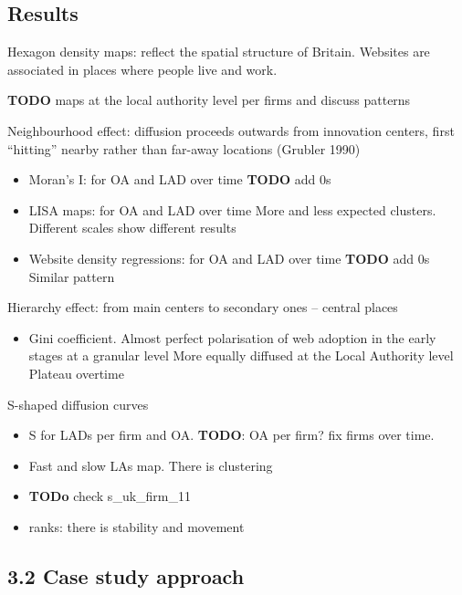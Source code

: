 \documentclass[preprint, 3p,
authoryear]{elsarticle} %
\providecommand{\tightlist}{%
  \setlength{\itemsep}{0pt}\setlength{\parskip}{0pt}}
\begin{document}
\hypertarget{sec3.1}{%
\subsection{Results}\label{sec3.1}}

Hexagon density maps: reflect the spatial structure of Britain. Websites
are associated in places where people live and work.

\textbf{TODO} maps at the local authority level per firms and discuss
patterns

Neighbourhood effect: diffusion proceeds outwards from innovation
centers, first ``hitting'' nearby rather than far-away locations
(Grubler 1990)

\begin{itemize}
\item
  Moran's I: for OA and LAD over time \textbf{TODO} add 0s
\item
  LISA maps: for OA and LAD over time More and less expected clusters.
  Different scales show different results
\item
  Website density regressions: for OA and LAD over time \textbf{TODO}
  add 0s Similar pattern
\end{itemize}

Hierarchy effect: from main centers to secondary ones -- central places

\begin{itemize}
\tightlist
\item
  Gini coefficient. Almost perfect polarisation of web adoption in the
  early stages at a granular level More equally diffused at the Local
  Authority level Plateau overtime
\end{itemize}

S-shaped diffusion curves

\begin{itemize}
\item
  S for LADs per firm and OA. \textbf{TODO}: OA per firm? fix firms over
  time.
\item
  Fast and slow LAs map. There is clustering
\item
  \textbf{TODo} check s\_uk\_firm\_11
\item
  ranks: there is stability and movement
\end{itemize}

\hypertarget{sec3.2}{%
\subsection{3.2 Case study approach}\label{sec3.2}}
\end{document}
